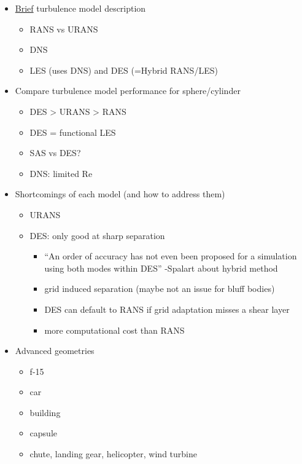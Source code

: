 \documentclass[journal]{new-aiaa}
\begin{document}
\begin{itemize}
    \item \underline{Brief} turbulence model description
    \begin{itemize}
        \item RANS vs URANS
        \item DNS
        \item LES (uses DNS) and DES (=Hybrid RANS/LES)
    \end{itemize}
    \item Compare turbulence model performance for sphere/cylinder
    \begin{itemize}
        \item DES > URANS > RANS
        \item DES = functional LES
        \item SAS vs DES?
        \item DNS: limited Re
    \end{itemize}
    \item Shortcomings of each model (and how to address them)
    \begin{itemize}
        \item URANS
        \item DES: only good at sharp separation
        \begin{itemize}
            \item ``An order of accuracy has not even been proposed for a simulation using both modes within DES'' -Spalart about hybrid method
            \item grid induced separation (maybe not an issue for bluff bodies)
            \item DES can default to RANS if grid adaptation misses a shear layer
            \item more computational cost than RANS
    \end{itemize}
    \end{itemize}
    \item Advanced geometries
    \begin{itemize}
        \item f-15
        \item car
        \item building
        \item capsule
        \item chute, landing gear, helicopter, wind turbine
    \end{itemize}
\end{itemize}
\end{document}
